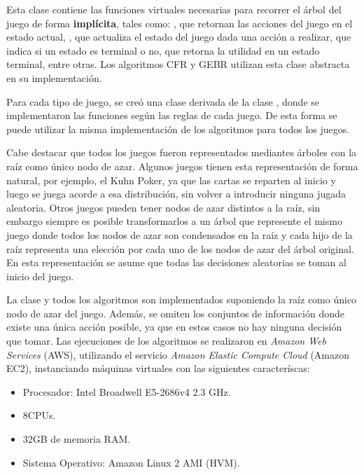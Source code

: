 Esta clase contiene las funciones virtuales necesarias para recorrer el árbol del juego de forma \textbf{implícita}, tales como: , que retornan las acciones del juego en el estado actual, , que actualiza el estado del juego dada una acción a realizar,  que indica si un estado es terminal o no,  que retorna la utilidad en un estado terminal, entre otras. Los algoritmos CFR y GEBR utilizan esta clase abstracta en su implementación.

Para cada tipo de juego, se creó una clase derivada de la clase , donde se implementaron las funciones según las reglas de cada juego. De esta forma se puede utilizar la misma implementación de los algoritmos para todos los juegos.

Cabe destacar que todos los juegos fueron representados mediantes árboles con la raíz como único nodo de azar. Algunos juegos tienen esta representación de forma natural, por ejemplo, el Kuhn Poker, ya que las cartas se reparten al inicio y luego se juega acorde a esa distribución, sin volver a introducir ninguna jugada aleatoria. Otros juegos pueden tener nodos de azar distintos a la raíz, sin embargo siempre es posible transformarlos a un árbol que represente el mismo juego donde todos los nodos de azar son condensados en la raíz y cada hijo de la raíz representa una elección por cada uno de los nodos de azar del árbol original. En esta representación se asume que todas las decisiones aleatorias se toman al inicio del juego.

La clase  y todos los algoritmos son implementados suponiendo la raíz como único nodo de azar del juego. Además, se omiten los conjuntos de información donde existe una única acción posible, ya que en estos casos no hay ninguna decisión que tomar. Las ejecuciones de los algoritmos se realizaron en \textit{Amazon Web Services} (AWS), utilizando el servicio \textit{Amazon Elastic Compute Cloud} (Amazon EC2), instanciando máquinas virtuales con las siguientes caracteríscas:
\begin{itemize}[noitemsep]
    \item Procesador: Intel Broadwell E5-2686v4 2.3 GHz.
    \item 8CPUs.
    \item 32GB de memoria RAM.
    \item Sistema Operativo: Amazon Linux 2 AMI (HVM).
\end{itemize}

